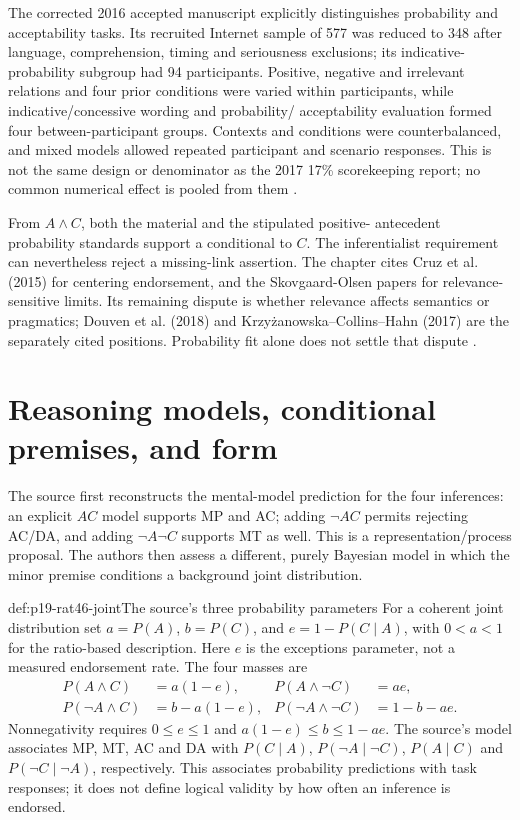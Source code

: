 The corrected 2016 accepted manuscript explicitly distinguishes probability
and acceptability tasks. Its recruited Internet sample of 577 was reduced
to 348 after language, comprehension, timing and seriousness exclusions;
its indicative-probability subgroup had 94 participants. Positive, negative
and irrelevant relations and four prior conditions were varied within
participants, while indicative/concessive wording and probability/
acceptability evaluation formed four between-participant groups. Contexts
and conditions were counterbalanced, and mixed models allowed repeated
participant and scenario responses. This is not the same design or
denominator as the 2017 17\% scorekeeping report; no common numerical
effect is pooled from them
\cite[accepted manuscript pp.~16--20]{SkovgaardOlsenSingmannKlauer2016Relevance}.

From \(A\land C\), both the material and the stipulated positive-
antecedent probability standards support a conditional to \(C\).
The inferentialist requirement can nevertheless reject a missing-link
assertion. The chapter cites Cruz et al. (2015) for centering endorsement,
and the Skovgaard-Olsen papers for relevance-sensitive limits. Its remaining
dispute is whether relevance affects semantics or pragmatics; Douven et al.
(2018) and Krzy\.{z}anowska--Collins--Hahn (2017) are the separately cited
positions. Probability fit alone does not settle that dispute
\cite[pp.~299--300]{OberauerPessach2021ProbabilitiesConditionals}.

\section{Reasoning models, conditional premises, and form}
\label{sec:p19-rat46-reasoning-models}

The source first reconstructs the mental-model prediction for the four
inferences: an explicit \(A C\) model supports MP and AC; adding
\(\neg A C\) permits rejecting AC/DA, and adding \(\neg A\neg C\)
supports MT as well. This is a representation/process proposal. The
authors then assess a different, purely Bayesian model in which the
minor premise conditions a background joint distribution.

\begin{hbdefinition}{def:p19-rat46-joint}{The source's three probability parameters}
For a coherent joint distribution set \(a=P(A)\), \(b=P(C)\),
and \(e=1-P(C\mid A)\), with \(0<a<1\) for the ratio-based
description. Here \(e\) is the exceptions parameter, not a measured
endorsement rate. The four masses are
\[
\begin{aligned}
 P(A\land C)&=a(1-e),&P(A\land\neg C)&=ae,\\
 P(\neg A\land C)&=b-a(1-e),&P(\neg A\land\neg C)&=1-b-ae.
\end{aligned}
\]
Nonnegativity requires \(0\leq e\leq1\) and
\(a(1-e)\leq b\leq1-ae\). The source's model associates MP, MT,
AC and DA with \(P(C\mid A)\), \(P(\neg A\mid\neg C)\),
\(P(A\mid C)\) and \(P(\neg C\mid\neg A)\), respectively.
This associates probability predictions with task responses; it does
not define logical validity by how often an inference is endorsed.
\end{hbdefinition}

